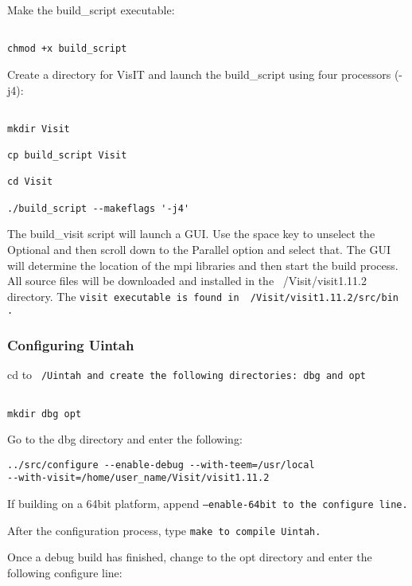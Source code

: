 Make the build_script executable:

\begin{verbatim}

chmod +x build_script

\end{verbatim}

Create a directory for VisIT and launch the build_script using four
processors (-j4):

\begin{verbatim}

mkdir Visit

cp build_script Visit

cd Visit

./build_script --makeflags '-j4'

\end{verbatim}

The build_visit script will launch a GUI.  Use the space key to
unselect the Optional and then scroll down to the Parallel option and
select that.  The GUI will determine the location of the mpi libraries
and then start the build process.  All source files will be downloaded
and installed in the ~/Visit/visit1.11.2 directory.  The \tt visit
\normalfont executable is found in ~/Visit/visit1.11.2/src/bin .

\subsubsection{Configuring Uintah}

cd to \tt ~/Uintah \normalfont and create the following directories:
dbg and opt

\begin{verbatim}

mkdir dbg opt

\end{verbatim}

Go to the dbg directory and enter the following:

\begin{Verbatim}[fontsize=\footnotesize]
../src/configure --enable-debug --with-teem=/usr/local
--with-visit=/home/user_name/Visit/visit1.11.2
\end{Verbatim}

If building on a 64bit platform, append \tt --enable-64bit \normalfont
to the configure line.

After the configuration process, type \tt make \normalfont to compile
Uintah.

Once a debug build has finished, change to the opt directory and enter
the following configure line:

